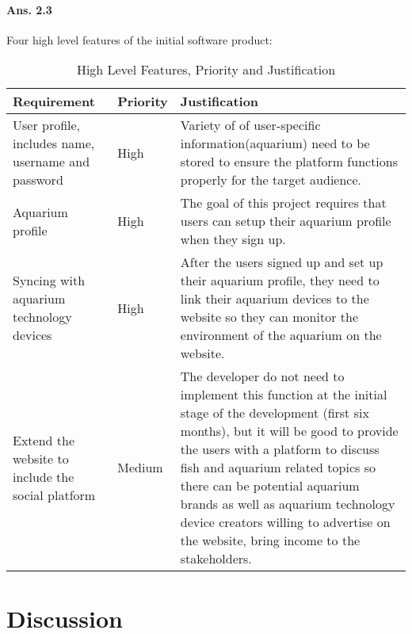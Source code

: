 \documentclass[paper=a4, fontsize=11pt]{scrartcl} %
\numberwithin{equation}{section} %
\numberwithin{figure}{section} %
\numberwithin{table}{section} %
\begin{document}
\paragraph{Ans. 2.3}Four high level features of the initial software product:

\begin{table}[htbp]
    \centering
    \caption{High Level Features, Priority and Justification }
    \begin{tabular}{p{2in}p{0.5in}p{2in}}
    \hline
    Requirement &Priority &Justification \\
    \hline 
    User profile, includes name, username and password & High & Variety of of user-specific information(aquarium) need to be stored to ensure the platform functions properly for the target audience\cite{userprofile}. \\
    \hline
     Aquarium profile & High & The goal of this project requires that users can setup their aquarium profile when they sign up.\\
     \hline
     Syncing with aquarium technology devices& High & After the users signed up and set up their aquarium profile, they need to link their aquarium devices to the website so they can monitor the environment of the aquarium on the website.\\
     \hline
      Extend the website to include the social platform& Medium &The developer do not need to implement this function at the initial stage of the development (first six months\cite{case}), but it will be good to provide the users with a platform to discuss fish and aquarium related topics so there can be potential aquarium brands as well as aquarium technology device creators willing to advertise on the website, bring income to the stakeholders. \\
    \hline
    \end{tabular}
\end{table}


\newpage
\section{Discussion}
\end{document}
